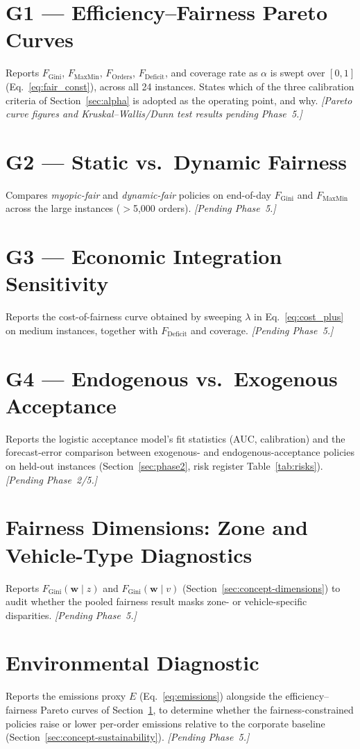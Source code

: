 \documentclass[12pt,a4paper]{report}
\begin{document}
\section{G1 --- Efficiency--Fairness Pareto Curves}
\label{sec:results-g1}
Reports $F_{\text{Gini}}$, $F_{\text{MaxMin}}$, $F_{\text{Orders}}$, $F_{\text{Deficit}}$, and coverage rate as $\alpha$ is swept over $[0,1]$ (Eq.~\ref{eq:fair_const}), across all 24 instances. States which of the three calibration criteria of Section~\ref{sec:alpha} is adopted as the operating point, and why. \textit{[Pareto curve figures and Kruskal--Wallis/Dunn test results pending Phase~5.]}

\section{G2 --- Static vs.\ Dynamic Fairness}
Compares \emph{myopic-fair} and \emph{dynamic-fair} policies on end-of-day $F_{\text{Gini}}$ and $F_{\text{MaxMin}}$ across the large instances ($>$5,000 orders). \textit{[Pending Phase~5.]}

\section{G3 --- Economic Integration Sensitivity}
Reports the cost-of-fairness curve obtained by sweeping $\lambda$ in Eq.~\eqref{eq:cost_plus} on medium instances, together with $F_{\text{Deficit}}$ and coverage. \textit{[Pending Phase~5.]}

\section{G4 --- Endogenous vs.\ Exogenous Acceptance}
Reports the logistic acceptance model's fit statistics (AUC, calibration) and the forecast-error comparison between exogenous- and endogenous-acceptance policies on held-out instances (Section~\ref{sec:phase2}, risk register Table~\ref{tab:risks}). \textit{[Pending Phase~2/5.]}

\section{Fairness Dimensions: Zone and Vehicle-Type Diagnostics}
Reports $F_{\text{Gini}}(\mathbf{w} \mid z)$ and $F_{\text{Gini}}(\mathbf{w} \mid v)$ (Section~\ref{sec:concept-dimensions}) to audit whether the pooled fairness result masks zone- or vehicle-specific disparities. \textit{[Pending Phase~5.]}

\section{Environmental Diagnostic}
\label{sec:results-sustainability}
Reports the emissions proxy $E$ (Eq.~\ref{eq:emissions}) alongside the efficiency--fairness Pareto curves of Section~\ref{sec:results-g1}, to determine whether the fairness-constrained policies raise or lower per-order emissions relative to the corporate baseline (Section~\ref{sec:concept-sustainability}). \textit{[Pending Phase~5.]}
\end{document}
